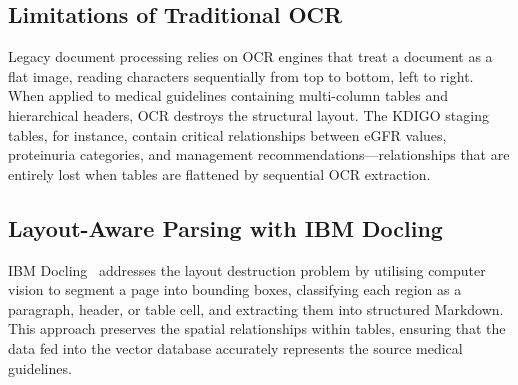 \documentclass[12pt,a4paper]{report}
\begin{document}
\subsection{Limitations of Traditional OCR}

Legacy document processing relies on OCR engines that treat a document as a flat image, reading characters sequentially from top to bottom, left to right. When applied to medical guidelines containing multi-column tables and hierarchical headers, OCR destroys the structural layout. The KDIGO staging tables, for instance, contain critical relationships between eGFR values, proteinuria categories, and management recommendations---relationships that are entirely lost when tables are flattened by sequential OCR extraction.

\subsection{Layout-Aware Parsing with IBM Docling}

IBM Docling~\cite{IBMDocling2024} addresses the layout destruction problem by utilising computer vision to segment a page into bounding boxes, classifying each region as a paragraph, header, or table cell, and extracting them into structured Markdown. This approach preserves the spatial relationships within tables, ensuring that the data fed into the vector database accurately represents the source medical guidelines.
\end{document}
